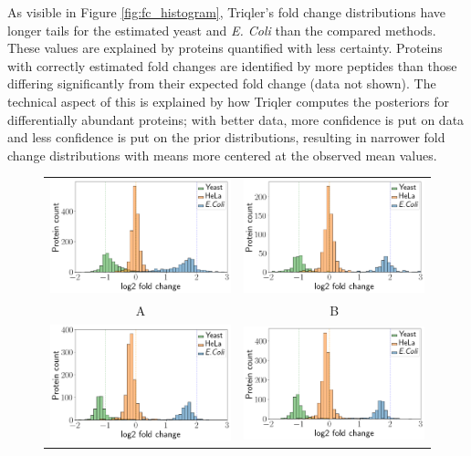 \documentclass[10pt,letterpaper]{article}
\begin{document}
As visible in Figure \ref{fig:fc_histogram}, Triqler's fold change distributions have longer tails for the estimated yeast and {\em E. Coli} than the compared methods. These values are explained by proteins quantified with less certainty. Proteins with correctly estimated fold changes are identified by more peptides than those differing significantly from their expected fold change (data not shown). The technical aspect of this is explained by how Triqler computes the posteriors for differentially abundant proteins; with better data, more confidence is put on data and less confidence is put on the prior distributions, resulting in narrower fold change distributions with means more centered at the observed mean values. 


\begin{figure}[hbt]
    \centering
    \begin{tabular}{cc}
	    \includegraphics[width=0.4\linewidth]{./img/histogram_ID_triqler.png} & 
	    \includegraphics[width=0.4\linewidth]{./img/histogram_ID_top3.png} \\ 
        A & B \\ 
	    \includegraphics[width=0.4\linewidth]{./img/histogram_ID_msstats.png} & 
	    \includegraphics[width=0.4\linewidth]{./img/histogram_ID_msqrob2.png} \\

\end{tabular}
\end{figure}
\end{document}
